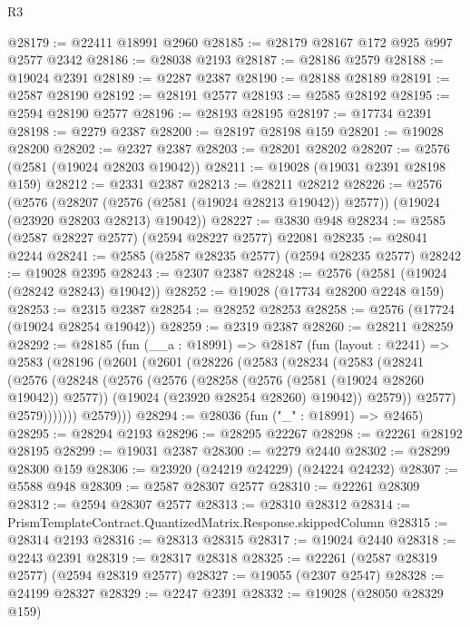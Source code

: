 \begin{lexlean}{R3}
\begin{coremodule}
@28179 := @22411 @18991 @2960
@28185 := @28179 @28167 @172 @925 @997 @2577 @2342
@28186 := @28038 @2193
@28187 := @28186 @2579
@28188 := @19024 @2391
@28189 := @2287 @2387
@28190 := @28188 @28189
@28191 := @2587 @28190
@28192 := @28191 @2577
@28193 := @2585 @28192
@28195 := @2594 @28190 @2577
@28196 := @28193 @28195
@28197 := @17734 @2391
@28198 := @2279 @2387
@28200 := @28197 @28198 @159
@28201 := @19028 @28200
@28202 := @2327 @2387
@28203 := @28201 @28202
@28207 := @2576 (@2581 (@19024 @28203 @19042))
@28211 := @19028 (@19031 @2391 @28198 @159)
@28212 := @2331 @2387
@28213 := @28211 @28212
@28226 := @2576
    (@2576
      (@28207 (@2576 (@2581 (@19024 @28213 @19042)) @2577))
      (@19024 (@23920 @28203 @28213) @19042))
@28227 := @3830 @948
@28234 := @2585 (@2587 @28227 @2577) (@2594 @28227 @2577) @22081
@28235 := @28041 @2244
@28241 := @2585 (@2587 @28235 @2577) (@2594 @28235 @2577)
@28242 := @19028 @2395
@28243 := @2307 @2387
@28248 := @2576 (@2581 (@19024 (@28242 @28243) @19042))
@28252 := @19028 (@17734 @28200 @2248 @159)
@28253 := @2315 @2387
@28254 := @28252 @28253
@28258 := @2576 (@17724 (@19024 @28254 @19042))
@28259 := @2319 @2387
@28260 := @28211 @28259
@28292 := @28185
    (fun (__a : @18991) =>
    @28187
      (fun (layout : @2241) =>
      @2583
        (@28196
          (@2601
            (@2601
              (@28226
                (@2583
                  (@28234
                    (@2583
                      (@28241
                        (@2576
                          (@28248
                            (@2576
                              (@2576
                                (@28258 (@2576 (@2581 (@19024 @28260 @19042)) @2577))
                                (@19024 (@23920 @28254 @28260) @19042))
                              @2579))
                          @2577)
                        @2579)))))))
          @2579)))
@28294 := @28036 (fun ("_" : @18991) => @2465)
@28295 := @28294 @2193
@28296 := @28295 @22267
@28298 := @22261 @28192 @28195
@28299 := @19031 @2387
@28300 := @2279 @2440
@28302 := @28299 @28300 @159
@28306 := @23920 (@24219 @24229) (@24224 @24232)
@28307 := @5588 @948
@28309 := @2587 @28307 @2577
@28310 := @22261 @28309
@28312 := @2594 @28307 @2577
@28313 := @28310 @28312
@28314 := PrismTemplateContract.QuantizedMatrix.Response.skippedColumn
@28315 := @28314 @2193
@28316 := @28313 @28315
@28317 := @19024 @2440
@28318 := @2243 @2391
@28319 := @28317 @28318
@28325 := @22261 (@2587 @28319 @2577) (@2594 @28319 @2577)
@28327 := @19055 (@2307 @2547)
@28328 := @24199 @28327
@28329 := @2247 @2391
@28332 := @19028 (@28050 @28329 @159)

\end{coremodule}
\end{lexlean}
